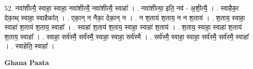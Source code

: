 \documentclass[17pt]{extarticle}
\begin{document}
52. नवा॑शीत्यै॒ स्वाहा॒ स्वाहा॒ नवा॑शीत्यै॒ नवा॑शीत्यै॒ स्वाहा᳚ । . नवा॑शीत्या॒ इति॒ नव॑ - अ॒शी॒त्यै॒ । . स्वाहैका॒ देका॒थ् स्वाहा॒ स्वाहैका᳚त् । . एका॒न् न नैका॒ देका॒न् न । . न श॒ताय॑ श॒ताय॒ न न श॒ताय॑ । . श॒ताय॒ स्वाहा॒ स्वाहा॑ श॒ताय॑ श॒ताय॒ स्वाहा᳚ । . स्वाहा॑ श॒ताय॑ श॒ताय॒ स्वाहा॒ स्वाहा॑ श॒ताय॑ । . श॒ताय॒ स्वाहा॒ स्वाहा॑ श॒ताय॑ श॒ताय॒ स्वाहा᳚ । . स्वाहा॒ सर्व॑स्मै॒ सर्व॑स्मै॒ स्वाहा॒ स्वाहा॒ सर्व॑स्मै । . सर्व॑स्मै॒ स्वाहा॒ स्वाहा॒ सर्व॑स्मै॒ सर्व॑स्मै॒ स्वाहा᳚ । . स्वाहेति॒ स्वाहा᳚ । \newline

\textbf{Ghana Paata } \newline
\end{document}
